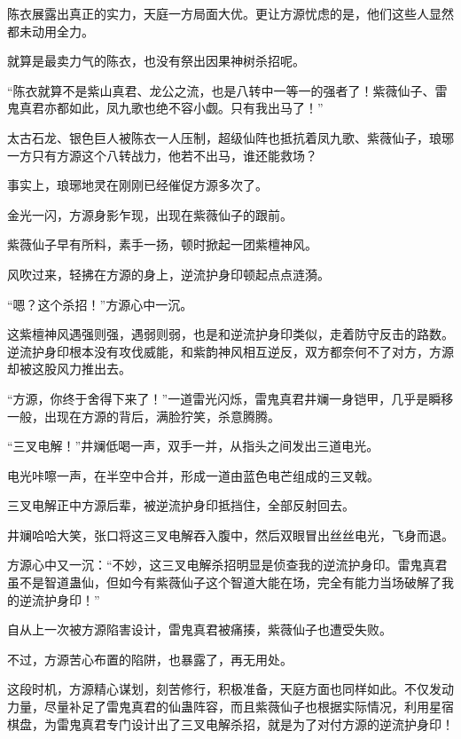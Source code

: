 
\begin{this_body}

陈衣展露出真正的实力，天庭一方局面大优。更让方源忧虑的是，他们这些人显然都未动用全力。

就算是最卖力气的陈衣，也没有祭出因果神树杀招呢。

“陈衣就算不是紫山真君、龙公之流，也是八转中一等一的强者了！紫薇仙子、雷鬼真君亦都如此，凤九歌也绝不容小觑。只有我出马了！”

太古石龙、银色巨人被陈衣一人压制，超级仙阵也抵抗着凤九歌、紫薇仙子，琅琊一方只有方源这个八转战力，他若不出马，谁还能救场？

事实上，琅琊地灵在刚刚已经催促方源多次了。

金光一闪，方源身影乍现，出现在紫薇仙子的跟前。

紫薇仙子早有所料，素手一扬，顿时掀起一团紫檀神风。

风吹过来，轻拂在方源的身上，逆流护身印顿起点点涟漪。

“嗯？这个杀招！”方源心中一沉。

这紫檀神风遇强则强，遇弱则弱，也是和逆流护身印类似，走着防守反击的路数。逆流护身印根本没有攻伐威能，和紫韵神风相互逆反，双方都奈何不了对方，方源却被这股风力推出去。

“方源，你终于舍得下来了！”一道雷光闪烁，雷鬼真君井斓一身铠甲，几乎是瞬移一般，出现在方源的背后，满脸狞笑，杀意腾腾。

“三叉电解！”井斓低喝一声，双手一并，从指头之间发出三道电光。

电光咔嚓一声，在半空中合并，形成一道由蓝色电芒组成的三叉戟。

三叉电解正中方源后辈，被逆流护身印抵挡住，全部反射回去。

井斓哈哈大笑，张口将这三叉电解吞入腹中，然后双眼冒出丝丝电光，飞身而退。

方源心中又一沉：“不妙，这三叉电解杀招明显是侦查我的逆流护身印。雷鬼真君虽不是智道蛊仙，但如今有紫薇仙子这个智道大能在场，完全有能力当场破解了我的逆流护身印！”

自从上一次被方源陷害设计，雷鬼真君被痛揍，紫薇仙子也遭受失败。

不过，方源苦心布置的陷阱，也暴露了，再无用处。

这段时机，方源精心谋划，刻苦修行，积极准备，天庭方面也同样如此。不仅发动力量，尽量补足了雷鬼真君的仙蛊阵容，而且紫薇仙子也根据实际情况，利用星宿棋盘，为雷鬼真君专门设计出了三叉电解杀招，就是为了对付方源的逆流护身印！


\end{this_body}
